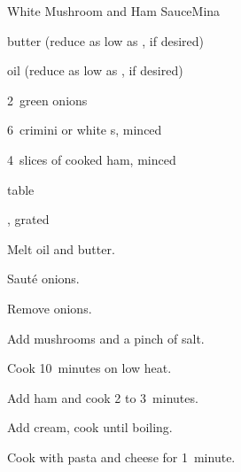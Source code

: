\begin{recipe}{White Mushroom and Ham Sauce}{Mina}{}

\begin{ingredients}
\item \C{\quarter} butter (reduce as low as , if desired)
\item \C{\half} oil (reduce as low as \C{\quarter}, if desired)
\item 2~green onions
\item 6~crimini or white s, minced
\item 4~slices of cooked ham, minced
\item {} table 
\item {}, grated
\end{ingredients}

\begin{directions}
\item Melt oil and butter.
\item Saut\'e onions.
\item Remove onions.
\item Add mushrooms and a pinch of salt.
\item Cook 10~minutes on low heat.
\item Add ham and cook 2 to 3~minutes.
\item Add cream, cook until boiling.
\item Cook with pasta and cheese for 1~minute.
\end{directions}

\end{recipe}
